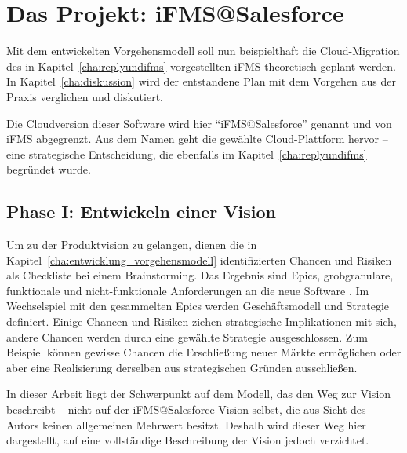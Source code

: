 \section{Das Projekt: iFMS@Salesforce}
\label{cha:result}
\begin{comment}
In Kapitel „Forschungsergebnisse“ stellen Sie die Ergebnisse ihrer Arbeit dar.
An dieser Stelle nehmen Sie noch keine Interpretation oder Erläuterung der 
Ergebnisse vor, sondern beschreiben rein deskriptiv ihre Befunde. Eine 
Auswertung findet im nachfolgenden Kapitel statt.
\end{comment}
Mit dem entwickelten 
Vorgehensmodell soll nun 
beispielthaft die Cloud-Migration 
des in Kapitel~\ref{cha:replyundifms} vorgestellten iFMS theoretisch geplant 
werden. In Kapitel~\ref{cha:diskussion} wird der entstandene Plan mit dem 
Vorgehen aus der Praxis verglichen und diskutiert.

Die Cloudversion dieser Software wird hier "`iFMS@Salesforce"' genannt und von 
iFMS abgegrenzt. Aus dem Namen geht die gewählte Cloud-Plattform hervor -- eine 
strategische Entscheidung, die ebenfalls im Kapitel~\ref{cha:replyundifms} begründet wurde.

\subsection{Phase I: Entwickeln einer Vision}
Um zu der Produktvision zu gelangen, dienen die in 
Kapitel~\ref{cha:entwicklung_vorgehensmodell} identifizierten Chancen und 
Risiken als Checkliste bei einem Brainstorming. Das Ergebnis sind Epics, 
grobgranulare, funktionale und nicht-funktionale Anforderungen an die neue 
Software .
Im Wechselspiel mit den gesammelten Epics werden Geschäftsmodell und Strategie 
definiert. Einige Chancen und Risiken ziehen strategische Implikationen mit 
sich, andere Chancen werden durch eine gewählte Strategie ausgeschlossen. Zum 
Beispiel können gewisse Chancen die Erschließung neuer Märkte ermöglichen oder aber 
eine Realisierung derselben aus strategischen Gründen ausschließen. 

In dieser Arbeit liegt der Schwerpunkt auf dem Modell, das den Weg zur Vision 
beschreibt -- nicht auf der iFMS@Salesforce-Vision selbst, die aus Sicht des 
Autors  keinen allgemeinen Mehrwert besitzt. Deshalb wird dieser Weg 
hier dargestellt, auf eine vollständige Beschreibung der Vision jedoch 
verzichtet. 
